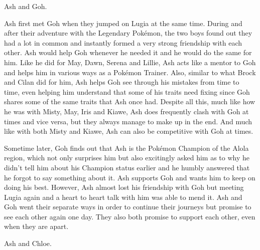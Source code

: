 \documentclass[a4paper,12pt]{article}
\begin{document}
Ash and Goh.\\ \par \vspace{0.5cm}

Ash first met Goh when they jumped on Lugia at the same time. During and after their adventure with the Legendary Pokémon, the two boys found out they had a lot in common and instantly formed a very strong friendship with each other. Ash would help Goh whenever he needed it and he would do the same for him. Like he did for May, Dawn, Serena and Lillie, Ash acts like a mentor to Goh and helps him in various ways as a Pokémon Trainer. Also, similar to what Brock and Cilan did for him, Ash helps Goh see through his mistakes from time to time, even helping him understand that some of his traits need fixing since Goh shares some of the same traits that Ash once had. Despite all this, much like how he was with Misty, May, Iris and Kiawe, Ash does frequently clash with Goh at times and vice versa, but they always manage to make up in the end. And much like with both Misty and Kiawe, Ash can also be competitive with Goh at times.\\ \par \vspace{0.5cm}

Sometime later, Goh finds out that Ash is the Pokémon Champion of the Alola region, which not only surprises him but also excitingly asked him as to why he didn't tell him about his Champion status earlier and he humbly answered that he forgot to say something about it. Ash supports Goh and wants him to keep on doing his best. However, Ash almost lost his friendship with Goh but meeting Lugia again and a heart to heart talk with him was able to mend it. Ash and Goh went their separate ways in order to continue their journeys but promise to see each other again one day. They also both promise to support each other, even when they are apart.\\ \par \vspace{0.5cm}

Ash and Chloe.\\ \par \vspace{0.5cm}
\end{document}
